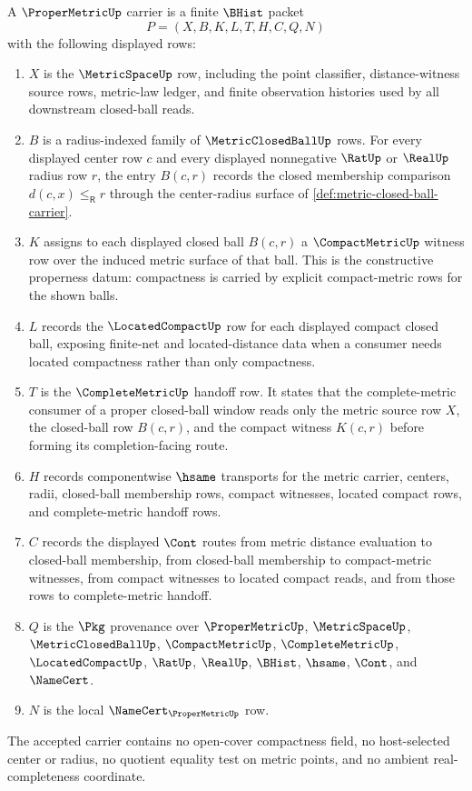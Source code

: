 \begin{definition}
\label{def:proper-metric-carrier}
A $\ProperMetricUp$ carrier is a finite $\BHist$ packet
$$
P=(X,B,K,L,T,H,C,Q,N)
$$
with the following displayed rows:
\begin{enumerate}
\item $X$ is the $\MetricSpaceUp$ row, including the point classifier, distance-witness source rows, metric-law ledger, and finite observation histories used by all downstream closed-ball reads.
\item $B$ is a radius-indexed family of $\MetricClosedBallUp$ rows. For every displayed center row $c$ and every displayed nonnegative $\RatUp$ or $\RealUp$ radius row $r$, the entry $B(c,r)$ records the closed membership comparison $d(c,x)\leq_{\mathsf R} r$ through the center-radius surface of \autoref{def:metric-closed-ball-carrier}.
\item $K$ assigns to each displayed closed ball $B(c,r)$ a $\CompactMetricUp$ witness row over the induced metric surface of that ball. This is the constructive properness datum: compactness is carried by explicit compact-metric rows for the shown balls.
\item $L$ records the $\LocatedCompactUp$ row for each displayed compact closed ball, exposing finite-net and located-distance data when a consumer needs located compactness rather than only compactness.
\item $T$ is the $\CompleteMetricUp$ handoff row. It states that the complete-metric consumer of a proper closed-ball window reads only the metric source row $X$, the closed-ball row $B(c,r)$, and the compact witness $K(c,r)$ before forming its completion-facing route.
\item $H$ records componentwise $\hsame$ transports for the metric carrier, centers, radii, closed-ball membership rows, compact witnesses, located compact rows, and complete-metric handoff rows.
\item $C$ records the displayed $\Cont$ routes from metric distance evaluation to closed-ball membership, from closed-ball membership to compact-metric witnesses, from compact witnesses to located compact reads, and from those rows to complete-metric handoff.
\item $Q$ is the $\Pkg$ provenance over $\ProperMetricUp$, $\MetricSpaceUp$, $\MetricClosedBallUp$, $\CompactMetricUp$, $\CompleteMetricUp$, $\LocatedCompactUp$, $\RatUp$, $\RealUp$, $\BHist$, $\hsame$, $\Cont$, and $\NameCert$.
\item $N$ is the local $\NameCert_{\ProperMetricUp}$ row.
\end{enumerate}
The accepted carrier contains no open-cover compactness field, no host-selected center or radius, no quotient equality test on metric points, and no ambient real-completeness coordinate.
\end{definition}

